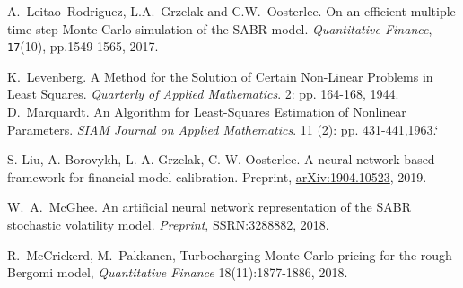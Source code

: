 \documentclass{article}
\theoremstyle{remark}
\begin{document}
\begin{thebibliography}{99}


 A.~Leitao~Rodriguez, L.A.~Grzelak and C.W.~Oosterlee. On an efficient multiple time step Monte Carlo simulation of the SABR model. \textit{Quantitative Finance}, {\tt 17}(10), pp.1549-1565, 2017.

 K.~Levenberg. A Method for the Solution of Certain Non-Linear Problems in Least Squares. \textit{Quarterly of Applied Mathematics}. 2: pp. 164-168, 1944.
 D.~Marquardt. An Algorithm for Least-Squares Estimation of Nonlinear Parameters. \textit{SIAM Journal on Applied Mathematics}. 11 (2): pp. 431-441,1963.`

 S. Liu, A. Borovykh, L. A. Grzelak, C. W. Oosterlee.
A neural network-based framework for financial model calibration.
Preprint, \href{https://arxiv.org/abs/1904.10523}{arXiv:1904.10523}, 2019.


W.~A.~McGhee. An artificial neural network representation of the SABR stochastic volatility model. \textit{Preprint}, \href{https://ssrn.com/abstract=3288882}{SSRN:3288882}, 2018.


 R.~McCrickerd, M.~Pakkanen, Turbocharging Monte Carlo pricing for the rough Bergomi model, \textit{Quantitative Finance} 18(11):1877-1886, 2018.




\end{thebibliography}
\end{document}
